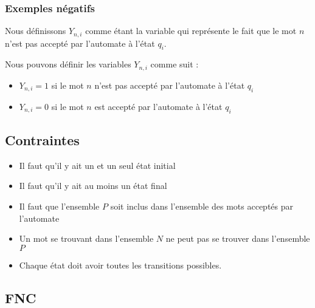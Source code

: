 \documentclass[a4paper, 12pt]{extarticle}
\begin{document}

\subsubsection{Exemples négatifs} %
\label{sec:exemples_negatifs} 

Nous définissons $Y_{n, i}$ comme étant la variable qui représente le fait que le mot $n$ n'est pas accepté par l'automate à l'état $q_i$. 

Nous pouvons définir les variables $Y_{n, i}$ comme suit : 
\begin{itemize}[label=$\bullet$]
    \item $Y_{n, i} = 1$ si le mot $n$ n'est pas accepté par l'automate à l'état $q_i$ 
    \item $Y_{n, i} = 0$ si le mot $n$ est accepté par l'automate à l'état $q_i$ 
\end{itemize}


\subsection{Contraintes} %
\label{sub:contraintes}

\begin{itemize}
    \item Il faut qu'il y ait un et un seul état initial 
    \item Il faut qu'il y ait au moins un état final
    \item Il faut que l'ensemble $P$ soit inclus dans l'ensemble des mots acceptés par l'automate 
    \item Un mot se trouvant dans l'ensemble $N$ ne peut pas se trouver dans l'ensemble $P$ 
    \item Chaque état doit avoir toutes les transitions possibles. 
\end{itemize}

\subsection{FNC} %
\label{sub:fnc} 


















\end{document}
